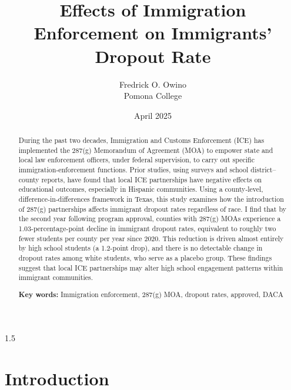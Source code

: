 \documentclass[12pt]{article}
\title{\textbf{Effects of Immigration Enforcement on Immigrants’ Dropout Rate}}
\author{%
  Fredrick O. Owino\\
  Pomona College%
}
\date{April 2025}
\begin{document}
\raggedbottom
\begin{spacing}{1.5}
\maketitle
\begin{abstract}

  \noindent During the past two decades, Immigration and Customs Enforcement (ICE) has implemented the 287(g) Memorandum of Agreement (MOA) to empower state and local law enforcement officers, under federal supervision, to carry
  out specific immigration‐enforcement functions. Prior studies, using
  surveys and school district–county reports, have found that local ICE
  partnerships have negative effects on educational outcomes, especially
  in Hispanic communities. Using a county‐level, difference‐in‐differences
  framework in Texas, this study examines how the introduction of 287(g)
  partnerships affects immigrant dropout rates regardless of race. I find
  that by the second year following program approval, counties with 287(g)
  MOAs experience a 1.03-percentage-point decline in immigrant dropout
  rates, equivalent to roughly two fewer students per county per year
  since 2020. This reduction is driven almost entirely by high school
  students (a 1.2-point drop), and there is no detectable change in
  dropout rates among white students, who serve as a placebo group.
  These findings suggest that local ICE partnerships may alter high school
  engagement patterns within immigrant communities.

  \vspace{0.5\baselineskip}
  \noindent\textbf{Key words:} Immigration enforcement, 287(g) MOA, dropout rates, approved, DACA
\end{abstract}
\newpage
\setlength{\parindent}{15pt}  %

\section{Introduction}


\end{spacing}
\end{document}
